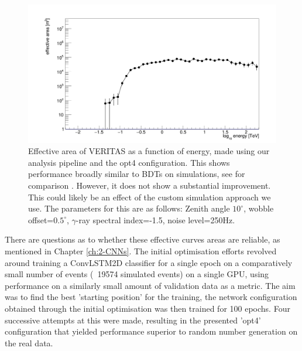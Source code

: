 \begin{figure}[] 
        \centering \includegraphics[width=\columnwidth]{figures/EFF.png}

        \caption{
                \label{fig:EFF} Effective area of VERITAS as a function of energy, made using our analysis pipeline and the opt4 configuration. This shows performance broadly similar to BDTs on simulations, see for comparison \cite{vereff}. However, it does not show a substantial improvement. This could likely be an effect of the custom simulation approach we use. The parameters for this are as follows: Zenith angle $10^{\circ}$, wobble offset=$0.5^{\circ}$, $\gamma$-ray spectral index=-1.5, noise level=250Hz. 
        }
\end{figure}
There are questions as to whether these effective curves areas are reliable, as mentioned in Chapter \ref{ch:2-CNNs}. 
The initial optimisation efforts revolved around training a ConvLSTM2D classifier for a single epoch on a comparatively small number of events (~19574 simulated events) on a single GPU, using performance on a similarly small amount of validation data as a metric. The aim was to find the best 'starting position' for the training, the network configuration obtained through the initial optimisation was then trained for 100 epochs. Four successive attempts at this were made, resulting in the presented 'opt4' configuration that yielded performance superior to random number generation on the real data. 


\begin{table}[h]
    \centering
    \caption{Anasum output for custom simulations alone run.}
    \label{table:RNG}
\end{table}

